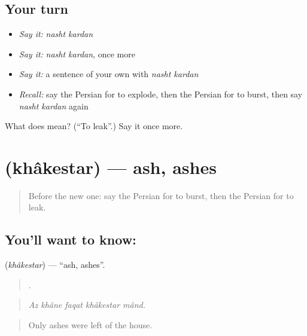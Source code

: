 \subsection*{Your turn}
\begin{itemize}
\raggedright
  \item \emph{Say it:} \emph{nasht kardan}
  \item \emph{Say it:} \emph{nasht kardan}, once more
  \item \emph{Say it:} a sentence of your own with \emph{nasht kardan}
  \item \emph{Recall:} say the Persian for to explode, then the Persian for to burst, then say \emph{nasht kardan} again
\end{itemize}

\begin{tcolorbox}[breakable,colback=teal!4,colframe=teal!35!black,title={Before you move on}]
What does   mean? (\textquotedblleft{}To leak\textquotedblright{}.) Say it once more.
\end{tcolorbox}
\section[\texorpdfstring{\fa{خاکستر} (khâkestar)}{خاکستر (khâkestar)}]{ (khâkestar) — ash, ashes}

\label{lesson:FA-C329-khakestar}



\begin{quote}
Before the new one: say the Persian for to burst, then the Persian for to leak.
\end{quote}

\subsection*{You'll want to know: }
\textbf{} (\emph{khâkestar}) — \textquotedblleft{}ash, ashes\textquotedblright{}.

\begin{quote}
    .
\end{quote}

\begin{quote}
\emph{Az khâne faqat khâkestar mând.}
\end{quote}

\begin{quote}
Only ashes were left of the house.
\end{quote}


